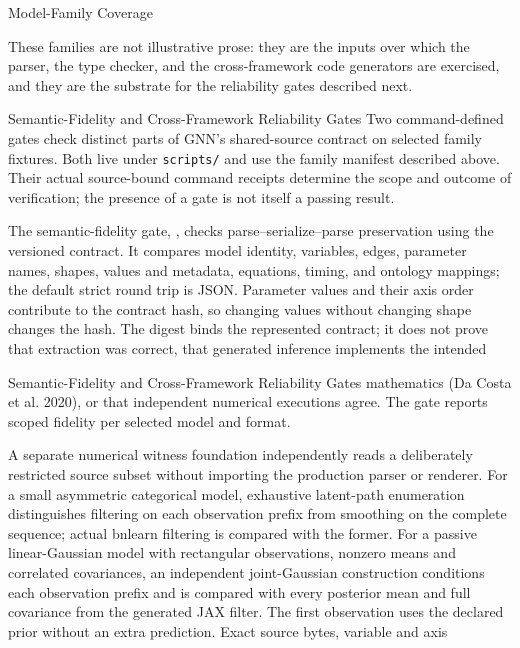 \documentclass[
  ignorenonframetext,
]{beamer}
\begin{document}
\begin{frame}{Model-Family Coverage}

These families are not illustrative prose: they are the inputs over
which the parser, the type checker, and the cross-framework code
generators are exercised, and they are the substrate for the reliability
gates described next.
\end{frame}

\begin{frame}{Semantic-Fidelity and
Cross-Framework Reliability Gates}
\protect{}\label{semantic-fidelity-and-cross-framework-reliability-gates}
Two command-defined gates check distinct parts of GNN's shared-source
contract on selected family fixtures. Both live under \texttt{scripts/}
and use the family manifest described above. Their actual source-bound
command receipts determine the scope and outcome of verification; the
presence of a gate is not itself a passing result.

The semantic-fidelity gate,
, checks
parse--serialize--parse preservation using the versioned
 contract. It compares model
identity, variables, edges, parameter names, shapes, values and
metadata, equations, timing, and ontology mappings; the default strict
round trip is JSON. Parameter values and their axis order contribute to
the contract hash, so changing values without changing shape changes the
hash. The digest binds the represented contract; it does not prove that
extraction was correct, that generated inference implements the intended
\end{frame}

\begin{frame}{Semantic-Fidelity and
Cross-Framework Reliability Gates}
mathematics (Da Costa et al. 2020), or that independent numerical
executions agree. The gate reports scoped fidelity per selected model
and format.

A separate numerical witness foundation independently reads a
deliberately restricted source subset without importing the production
parser or renderer. For a small asymmetric categorical model, exhaustive
latent-path enumeration distinguishes filtering on each observation
prefix from smoothing on the complete sequence; actual bnlearn filtering
is compared with the former. For a passive linear-Gaussian model with
rectangular observations, nonzero means and correlated covariances, an
independent joint-Gaussian construction conditions each observation
prefix and is compared with every posterior mean and full covariance
from the generated JAX filter. The first observation uses the declared
prior without an extra prediction. Exact source bytes, variable and axis
\end{frame}
\end{document}
